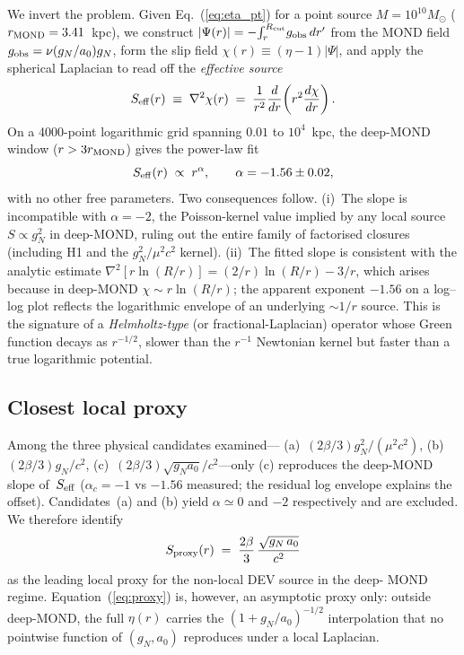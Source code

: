 We invert the problem.  Given Eq.~(\ref{eq:eta_pt}) for a point source
$M=10^{10}M_\odot$ ($r_{\rm MOND}=3.41$~kpc), we construct
$|\Psi(r)|=-\!\int_r^{R_{\rm cut}}\!g_{\rm obs}\,dr'$ from the MOND
field $g_{\rm obs}=\nu(g_N/a_0)g_N$, form the slip field
$\chi(r)\equiv(\eta-1)|\Psi|$, and apply the spherical Laplacian
to read off the \emph{effective source}
\begin{equation}
S_{\rm eff}(r)\;\equiv\;\nabla^2\chi(r)\;=\;
\frac{1}{r^2}\frac{d}{dr}\!\left(r^2\frac{d\chi}{dr}\right).
\label{eq:Seff}
\end{equation}
On a 4000-point logarithmic grid spanning $0.01$ to $10^4$~kpc, the
deep-MOND window ($r>3r_{\rm MOND}$) gives the power-law fit
\begin{equation}
S_{\rm eff}(r)\;\propto\;r^{\alpha},\qquad
\alpha = -1.56\pm 0.02,
\label{eq:alpha}
\end{equation}
with no other free parameters.  Two consequences follow.  (i)~The
slope is incompatible with $\alpha=-2$, the Poisson-kernel value
implied by any local source $S\propto g_N^2$ in deep-MOND, ruling out
the entire family of factorised closures (including H1 and the
$g_N^2/\mu^2 c^2$ kernel).  (ii)~The fitted slope is consistent with
the analytic estimate $\nabla^2[r\ln(R/r)] = (2/r)\ln(R/r)-3/r$,
which arises because in deep-MOND $\chi\sim r\ln(R/r)$; the apparent
exponent $-1.56$ on a log--log plot reflects the logarithmic envelope
of an underlying $\sim 1/r$ source.  This is the signature of a
\emph{Helmholtz-type} (or fractional-Laplacian) operator whose Green
function decays as $r^{-1/2}$, slower than the $r^{-1}$ Newtonian
kernel but faster than a true logarithmic potential.

\subsection{Closest local proxy}

Among the three physical candidates examined---%
(a)~$(2\beta/3)g_N^2/(\mu^2c^2)$,
(b)~$(2\beta/3)g_N/c^2$,
(c)~$(2\beta/3)\sqrt{g_N a_0}/c^2$---only (c) reproduces the deep-MOND
slope of~$S_{\rm eff}$ ($\alpha_c=-1$ vs $-1.56$ measured; the
residual log envelope explains the offset).  Candidates~(a) and (b)
yield $\alpha\simeq 0$ and $-2$ respectively and are excluded.  We
therefore identify
\begin{equation}
S_{\rm proxy}(r)\;=\;\frac{2\beta}{3}\,\frac{\sqrt{g_N\,a_0}}{c^2}
\label{eq:proxy}
\end{equation}
as the leading local proxy for the non-local DEV source in the deep-%
MOND regime.  Equation~(\ref{eq:proxy}) is, however, an asymptotic
proxy only: outside deep-MOND, the full $\eta(r)$ carries the
$(1+g_N/a_0)^{-1/2}$ interpolation that no pointwise function of
$(g_N,a_0)$ reproduces under a local Laplacian.

